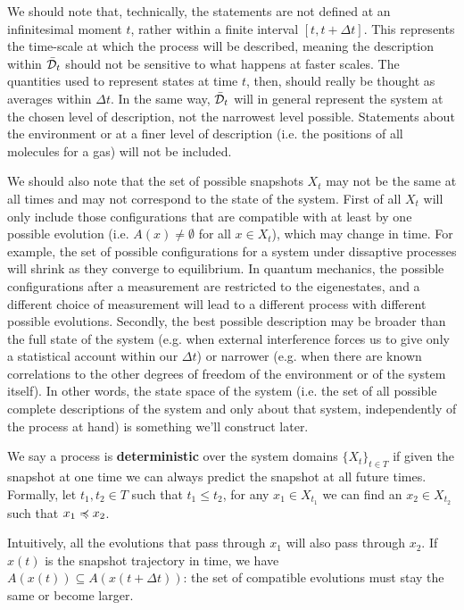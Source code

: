 \documentclass[letterpaper]{article}
\begin{document}
We should note that, technically, the statements are not defined at an infinitesimal moment $t$, rather within a finite interval $[t, t + \Delta t]$. This represents the time-scale at which the process will be described, meaning the description within $\bar{\mathcal{D}}_t$ should not be sensitive to what happens at faster scales. The quantities used to represent states at time $t$, then, should really be thought as averages within $\Delta t$. In the same way, $\bar{\mathcal{D}}_t$ will in general represent the system at the chosen level of description, not the narrowest level possible. Statements about the environment or at a finer level of description (i.e. the positions of all molecules for a gas) will not be included.

We should also note that the set of possible snapshots $X_t$ may not be the same at all times and may not correspond to the state of the system. First of all $X_t$ will only include those configurations that are compatible with at least by one possible evolution (i.e. $A(x) \neq \emptyset$ for all $x \in X_t$), which may change in time. For example, the set of possible configurations for a system under dissaptive processes will shrink as they converge to equilibrium. In quantum mechanics, the possible configurations after a measurement are restricted to the eigenestates, and a different choice of measurement will lead to a different process with different possible evolutions. Secondly, the best possible description may be broader than the full state of the system (e.g. when external interference forces us to give only a statistical account within our $\Delta t$) or narrower (e.g. when there are known correlations to the other degrees of freedom of the environment or of the system itself). In other words, the state space of the system (i.e. the set of all possible complete descriptions of the system and only about that system, independently of the process at hand) is something we'll construct later.

We say a process is \textbf{deterministic} over the system domains $\{X_t\}_{t \in T}$ if given the snapshot at one time we can always predict the snapshot at all future times. Formally, let $t_1, t_2 \in T$ such that $t_1 \leq t_2$, for any $x_1 \in X_{t_1}$ we can find an $x_2 \in X_{t_2}$ such that $x_1 \preccurlyeq x_2$.

Intuitively, all the evolutions that pass through $x_1$ will also pass through $x_2$. If $x(t)$ is the snapshot trajectory in time, we have $A(x(t)) \subseteq A(x(t + \Delta t))$: the set of compatible evolutions must stay the same or become larger.
\end{document}

